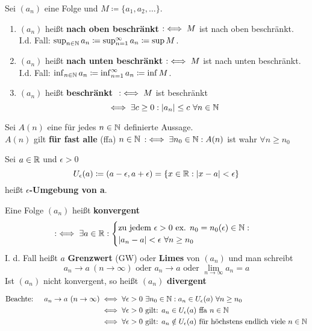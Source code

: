 \begin{definition*} 
	Sei $(a_{n})$ eine Folge und $M \coloneqq \{ a_{1}, a_{2}, \dotsc \}$.
	\begin{enumerate}
		\item$(a_{n})$ hei{\ss}t \textbf{nach oben beschränkt} $:\iff M$ ist nach oben beschränkt. I.d. Fall: $\sup_{n \in \mathbb{N}} a_{n} \coloneqq \sup_{n = 1}^{\infty} a_{n} \coloneqq \sup M$.
		\item$(a_{n})$ hei{\ss}t \textbf{nach unten beschränkt} $:\iff M$ ist nach unten beschränkt. I.d. Fall: $\inf_{n \in \mathbb{N}} a_{n} \coloneqq \inf_{n = 1}^{\infty} a_{n} \coloneqq \inf M$.
		\item$(a_{n})$ hei{\ss}t \textbf{beschränkt} $~:\iff M$ ist beschränkt 
			$$ \iff \exists c \geq 0: |a_{n}| \leq c ~\forall n \in \mathbb{N} $$
	\end{enumerate}
\end{definition*}


\begin{definition*} 
	Sei $A(n)$ eine für jedes $n \in \mathbb{N}$ definierte Aussage. \\
	$A(n)$ gilt \textbf{für fast alle} (ffa) $n \in \mathbb{N}$ $:\iff \exists n_{0} \in \mathbb{N}: A(n)$ ist wahr $\forall n \geq n_{0}$
\end{definition*}


\begin{definition*} 
	Sei $a \in \mathbb{R}$ und $\epsilon > 0$
		$$ U_{\epsilon}(a) \coloneqq (a - \epsilon, a + \epsilon) = \{ x \in \mathbb{R} : | x - a| < \epsilon \} $$
	hei{\ss}t $\epsilon$\textbf{-Umgebung von a}.
\end{definition*}


\begin{definition*}    
	Eine Folge $(a_{n})$ hei{\ss}t \textbf{konvergent}
	$$ :\iff \exists a \in \mathbb{R} : \begin{cases} \text{zu jedem } \epsilon > 0 \text{ ex. } n_{0} = n_{0}(\epsilon) \in \mathbb{N}: \\
		|a_{n} - a| < \epsilon ~\forall n \geq n_{0}
	\end{cases} $$
	I. d. Fall hei{\ss}t $a$ \textbf{Grenzwert} (GW) oder \textbf{Limes} von $(a_{n})$ und man schreibt
	$$ 
		a_{n} \rightarrow a ~(n \rightarrow \infty) \text{ oder } a_{n} \rightarrow a \text{ oder } \lim_{n \rightarrow \infty} a_{n} = a
	$$
	Ist $(a_{n})$ nicht konvergent, so hei{\ss}t $(a_{n})$ \textbf{divergent}

	\begin{align*}
		\text{Beachte: } \quad a_{n} \rightarrow a ~(n \rightarrow \infty) & \iff \forall \epsilon > 0 ~\exists n_{0} \in \mathbb{N}: a_{n} \in U_{\epsilon}(a) ~\forall n \geq n_{0} \\
				& \iff \forall \epsilon > 0 \text{ gilt: } a_{n} \in U_{\epsilon}(a) \text{ ffa } n \in \mathbb{N} \\
				& \iff \forall \epsilon > 0 \text{ gilt: } a_{n} \notin U_{\epsilon}(a) \text{ für höchstens endlich viele } n \in \mathbb{N}
	\end{align*}
\end{definition*}


